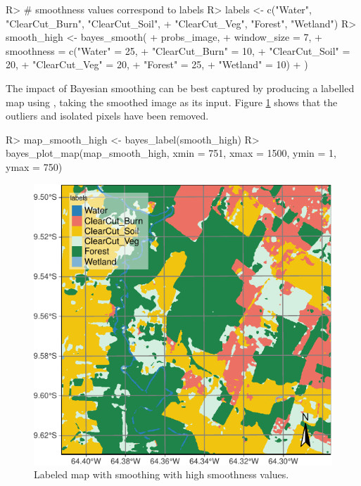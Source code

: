 \documentclass[
  shortnames]{jss}
\begin{document}
\begin{CodeChunk}
\begin{CodeInput}
R> # smoothness values correspond to labels 
R> labels <- c("Water", "ClearCut_Burn", "ClearCut_Soil",
+             "ClearCut_Veg", "Forest", "Wetland")
R> smooth_high <- bayes_smooth(
+     probs_image,
+     window_size = 7,
+     smoothness = c("Water" = 25, 
+                    "ClearCut_Burn" = 10, 
+                    "ClearCut_Soil" = 20, 
+                    "ClearCut_Veg" =  20, 
+                    "Forest" = 25, 
+                    "Wetland" = 10)
+ )
\end{CodeInput}
\end{CodeChunk}

The impact of Bayesian smoothing can be best captured by producing a labelled map using , taking the smoothed image as its input. Figure \ref{fig:smth1} shows that the outliers and isolated pixels have been removed.

\begin{CodeChunk}
\begin{CodeInput}
R> map_smooth_high <- bayes_label(smooth_high)
R> bayes_plot_map(map_smooth_high, xmin = 751, xmax = 1500, ymin = 1, ymax = 750)
\end{CodeInput}
\begin{figure}[h]

{\centering \includegraphics{Bayesian_smoothing_JSS_files/figure-latex/smth1-1} 

}

\caption[Labeled map with smoothing with high smoothness values]{Labeled map with smoothing with high smoothness values.}\label{fig:smth1}
\end{figure}
\end{CodeChunk}
\end{document}
